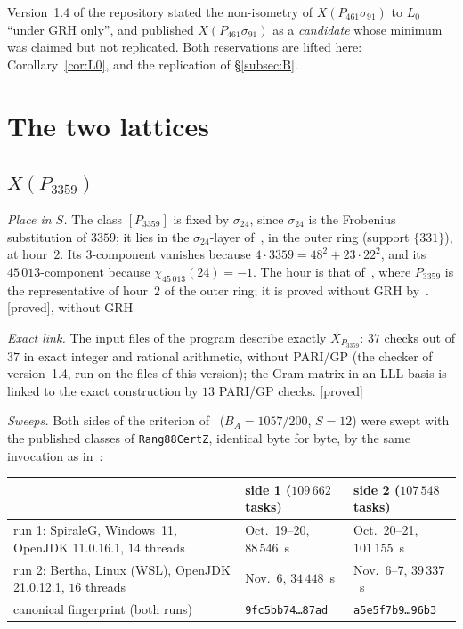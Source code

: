 \documentclass[11pt,a4paper]{amsart}
\theoremstyle{plain}
\theoremstyle{definition}
\newcommand{\Lz}{L_{0}}
\newcommand{\XA}{X(P_{3359})}
\newcommand{\XB}{X(P_{461}\sigma_{91})}
\newcommand{\st}[1]{\textup{\textsf{\small[#1]}}}
\newcommand{\DEM}{\st{proved}}
\begin{document}
Version~1.4 of the repository stated the non-isometry of $\XB$ to $\Lz$ ``under GRH only'', and published $\XB$ as a \emph{candidate} whose minimum was claimed but not replicated. Both reservations are lifted here: Corollary~\ref{cor:L0}, and the replication of \S\ref{subsec:B}.

\section{The two lattices}\label{sec:reseaux}

\subsection{\texorpdfstring{$\XA$}{X(P3359)}}\label{subsec:A}
\emph{Place in $S$.} The class $[P_{3359}]$ is fixed by $\sigma_{24}$, since $\sigma_{24}$ is the Frobenius substitution of $3359$; it lies in the $\sigma_{24}$-layer of~\cite[\S4]{Gau26a}, in the outer ring (support $\{331\}$), at hour~$2$. Its $3$-component vanishes because $4\cdot3359=48^2+23\cdot22^2$, and its $45\,013$-component because $\chi_{45\,013}(24)=-1$. The hour is that of~\cite[Table~3]{Gau26a}, where $P_{3359}$ is the representative of hour~$2$ of the outer ring; it is proved without GRH by~\cite[Prop.~4.7, Cor.~4.8]{Gau26a}. \DEM, without GRH

\emph{Exact link.} The input files of the program describe exactly $X_{P_{3359}}$: $37$ checks out of $37$ in exact integer and rational arithmetic, without PARI/GP (the checker of version~1.4, run on the files of this version); the Gram matrix in an LLL basis is linked to the exact construction by $13$ PARI/GP checks. \DEM

\emph{Sweeps.} Both sides of the criterion of~\cite[Thm.~4.6]{Gau26} ($B_A=1057/200$, $S=12$) were swept with the published classes of \texttt{Rang88CertZ}, identical byte for byte, by the same invocation as in~\cite{Gau26}:

\begin{center}\small
\begin{tabular}{>{\raggedright\arraybackslash}p{5.6cm}ll}
\toprule
& side 1 ($109\,662$ tasks) & side 2 ($107\,548$ tasks) \\
\midrule
run 1: SpiraleG, Windows~11, OpenJDK 11.0.16.1, $14$ threads & Oct.~19--20, $88\,546$~s & Oct.~20--21, $101\,155$~s \\
run 2: Bertha, Linux (WSL), OpenJDK 21.0.12.1, $16$ threads & Nov.~6, $34\,448$~s & Nov.~6--7, $39\,337$~s \\
\midrule
canonical fingerprint (both runs) & \texttt{9fc5bb74\dots87ad} & \texttt{a5e5f7b9\dots96b3} \\
\bottomrule
\end{tabular}
\end{center}
\end{document}
